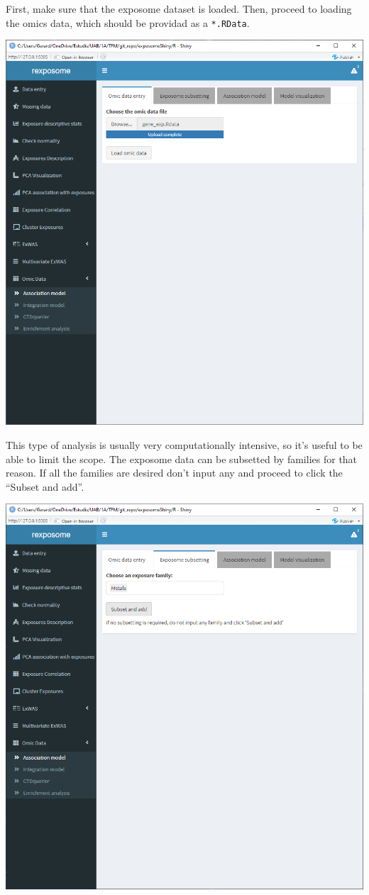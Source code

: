 \documentclass[
]{book}
\begin{document}
First, make sure that the exposome dataset is loaded. Then, proceed to loading the omics data, which should be providad as a \texttt{*.RData}.

\includegraphics{images/analysis9_2.png}

This type of analysis is usually very computationally intensive, so it's useful to be able to limit the scope. The exposome data can be subsetted by families for that reason. If all the families are desired don't input any and proceed to click the ``Subset and add''.

\includegraphics{images/analysis9_3.png}
\end{document}
